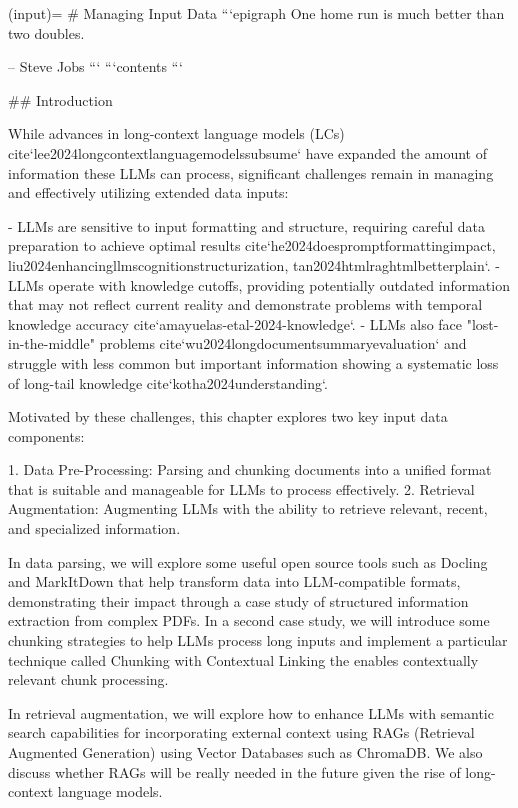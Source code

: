 (input)=
# Managing Input Data
```{epigraph}
One home run is much better than two doubles.

-- Steve Jobs
```
```{contents}
```

## Introduction

While advances in long-context language models (LCs) {cite}`lee2024longcontextlanguagemodelssubsume` have expanded the amount of information these LLMs can process, significant challenges remain in managing and effectively utilizing extended data inputs:

- LLMs are sensitive to input formatting and structure, requiring careful data preparation to achieve optimal results {cite}`he2024doespromptformattingimpact, liu2024enhancingllmscognitionstructurization, tan2024htmlraghtmlbetterplain`.
- LLMs operate with knowledge cutoffs, providing potentially outdated information that may not reflect current reality and demonstrate problems with temporal knowledge accuracy {cite}`amayuelas-etal-2024-knowledge`.
- LLMs also face "lost-in-the-middle" problems {cite}`wu2024longdocumentsummaryevaluation` and struggle with less common but important information showing a systematic loss of long-tail knowledge {cite}`kotha2024understanding`.

Motivated by these challenges, this chapter explores two key input data components:

1. Data Pre-Processing: Parsing and chunking documents into a unified format that is suitable and manageable for LLMs to process effectively.
2. Retrieval Augmentation: Augmenting LLMs with the ability to retrieve relevant, recent, and specialized information.

In data parsing, we will explore some useful open source tools such as Docling and MarkItDown that help transform data into LLM-compatible formats, demonstrating their impact through a case study of structured information extraction from complex PDFs. In a second case study, we will introduce some chunking strategies to help LLMs process long inputs and implement a particular technique called Chunking with Contextual Linking the enables contextually relevant chunk processing.

In retrieval augmentation, we will explore how to enhance LLMs with semantic search capabilities for incorporating external context using RAGs (Retrieval Augmented Generation) using Vector Databases such as ChromaDB. We also discuss whether RAGs will be really needed in the future given the rise of long-context language models.

